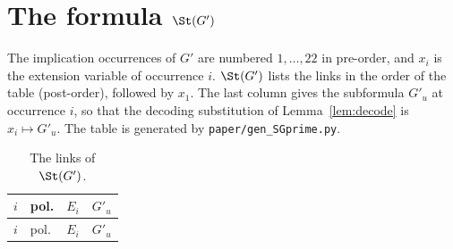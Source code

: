 \section{The formula $\St(G')$}\label{app:SG}
The implication occurrences of $G'$ are numbered $1,\dots,22$ in pre-order,
and $x_i$ is the extension variable of occurrence $i$. $\St(G')$ lists the
links in the order of the table (post-order), followed by $x_1$. The last
column gives the subformula $G'_u$ at occurrence $i$, so that the decoding
substitution of Lemma~\ref{lem:decode} is $x_i\mapsto G'_u$. The table is
generated by \texttt{paper/gen\_SGprime.py}.

{\small
\begin{longtable}{lllp{5.6cm}}
\caption{The links of $\St(G')$.}\label{tab:SG}\\
$i$ & pol. & $E_i$ & $G'_u$\\\hline
\endfirsthead
$i$ & pol. & $E_i$ & $G'_u$\\\hline
\endhead

\end{longtable}
}
